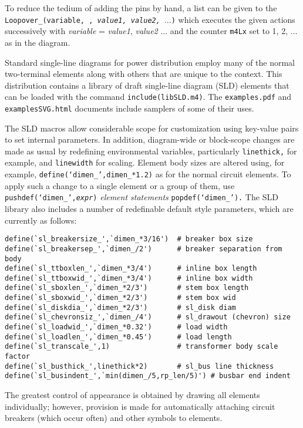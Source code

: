 To reduce the tedium of adding the pins by hand, a list
can be given to the
{\tt Loopover\_(variable,
,
{\sl value1, value2, $\ldots$})}
which executes the given actions successively with
 {\sl variable} = {\sl value1}, {\sl value2} $\ldots$ and the
 counter {\tt m4Lx} set to 1, 2, $\ldots$ as in the diagram.


 Standard single-line diagrams for power distribution employ many of
 the normal two-terminal elements along with others that are unique to
 the context.  This distribution contains a library of draft single-line
 diagram (SLD) elements that can be loaded with the
 command {\tt include(libSLD.m4)}.
 The {\tt examples.pdf} and {\tt examplesSVG.html}
 documents include samplers of some of their uses.

 The SLD macros allow considerable scope for
 customization using key-value pairs to set internal parameters.
 In addition, diagram-wide or block-scope changes are made as usual
 by redefining environmental variables, particularly
 {\tt linethick,} for example, and {\tt linewidth} for scaling.
 Element body sizes are altered using, for example,
 {\tt define(`dimen\_',dimen\_*1.2)} as for the normal circuit elements.
 To apply such a change to a single element or a group of them,
 use {\tt pushdef(`dimen\_',{\sl expr})} {\sl element statements}
 {\tt popdef(`dimen\_').} 
The SLD library also includes a number of redefinable default
style parameters, which are currently as follows:
\begin{verbatim}
define(`sl_breakersize_',`dimen_*3/16')  # breaker box size
define(`sl_breakersep_',`dimen_/2')      # breaker separation from body
define(`sl_ttboxlen_',`dimen_*3/4')      # inline box length
define(`sl_ttboxwid_',`dimen_*3/4')      # inline box width
define(`sl_sboxlen_',`dimen_*2/3')       # stem box length
define(`sl_sboxwid_',`dimen_*2/3')       # stem box wid
define(`sl_diskdia_',`dimen_*2/3')       # sl_disk diam
define(`sl_chevronsiz_',`dimen_/4')      # sl_drawout (chevron) size
define(`sl_loadwid_',`dimen_*0.32')      # load width
define(`sl_loadlen_',`dimen_*0.45')      # load length
define(`sl_transcale_',1)                # transformer body scale factor
define(`sl_busthick_',linethick*2)       # sl_bus line thickness
define(`sl_busindent_',`min(dimen_/5,rp_len/5)') # busbar end indent
\end{verbatim}

 The greatest control of appearance is obtained by drawing all
 elements individually; however,
 provision is made for automatically attaching circuit breakers
 (which occur often)
 and other symbols to elements.

